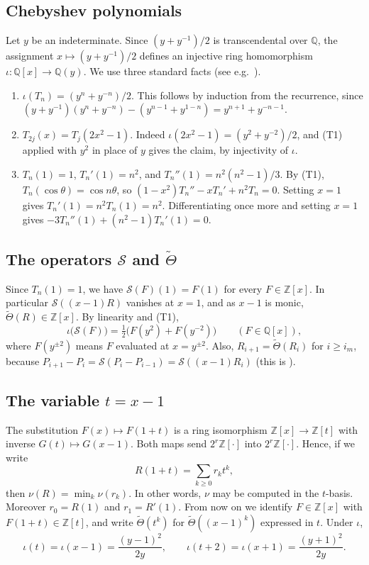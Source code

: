 \documentclass[11pt]{amsart}
\theoremstyle{definition}
\theoremstyle{remark}
\newcommand{\Z}{\mathbb{Z}}
\newcommand{\Q}{\mathbb{Q}}
\newcommand{\Sop}{\mathcal{S}}
\newcommand{\Th}{\widetilde{\Theta}}
\begin{document}
\subsection{Chebyshev polynomials}
Let $y$ be an indeterminate. Since $(y+y^{-1})/2$ is transcendental over $\Q$, the assignment $x\mapsto (y+y^{-1})/2$ defines an injective ring homomorphism $\iota\colon\Q[x]\to\Q(y)$. We use three standard facts (see e.g.\ \cite{MH}).
\begin{enumerate}[(T1)]
\item $\iota(T_n)=(y^n+y^{-n})/2$. This follows by induction from the recurrence, since $(y+y^{-1})(y^n+y^{-n})-(y^{n-1}+y^{1-n})=y^{n+1}+y^{-n-1}$.
\item $T_{2j}(x)=T_j(2x^2-1)$. Indeed $\iota(2x^2-1)=(y^2+y^{-2})/2$, and (T1) applied with $y^2$ in place of $y$ gives the claim, by injectivity of $\iota$.
\item $T_n(1)=1$, $T_n'(1)=n^2$, and $T_n''(1)=n^2(n^2-1)/3$. By (T1), $T_n(\cos\theta)=\cos n\theta$, so $(1-x^2)T_n''-xT_n'+n^2T_n=0$. Setting $x=1$ gives $T_n'(1)=n^2T_n(1)=n^2$. Differentiating once more and setting $x=1$ gives $-3T_n''(1)+(n^2-1)T_n'(1)=0$.
\end{enumerate}

\subsection{The operators \texorpdfstring{$\Sop$}{S} and \texorpdfstring{$\Th$}{Theta}}
Since $T_n(1)=1$, we have $\Sop(F)(1)=F(1)$ for every $F\in\Z[x]$. In particular $\Sop((x-1)R)$ vanishes at $x=1$, and as $x-1$ is monic, $\Th(R)\in\Z[x]$. By linearity and (T1),
\begin{equation}\label{eq:Siota}
  \iota\big(\Sop(F)\big)=\tfrac12\big(F(y^2)+F(y^{-2})\big)\qquad(F\in\Q[x]),
\end{equation}
where $F(y^{\pm2})$ means $F$ evaluated at $x=y^{\pm2}$. Also, $R_{i+1}=\Th(R_i)$ for $i\ge i_m$, because $P_{i+1}-P_i=\Sop(P_i-P_{i-1})=\Sop((x-1)R_i)$ (this is \cite[Lemma~6.1]{ST}).

\subsection{The variable \texorpdfstring{$t=x-1$}{t = x - 1}}
The substitution $F(x)\mapsto F(1+t)$ is a ring isomorphism $\Z[x]\to\Z[t]$ with inverse $G(t)\mapsto G(x-1)$. Both maps send $2^r\Z[\cdot]$ into $2^r\Z[\cdot]$. Hence, if we write
\[
  R(1+t)=\sum_{k\ge0}r_kt^k ,
\]
then $\nu(R)=\min_k\nu(r_k)$. In other words, $\nu$ may be computed in the $t$-basis. Moreover $r_0=R(1)$ and $r_1=R'(1)$. From now on we identify $F\in\Z[x]$ with $F(1+t)\in\Z[t]$, and write $\Th(t^k)$ for $\Th((x-1)^k)$ expressed in $t$. Under $\iota$,
\begin{equation}\label{eq:tiota}
  \iota(t)=\iota(x-1)=\frac{(y-1)^2}{2y},\qquad \iota(t+2)=\iota(x+1)=\frac{(y+1)^2}{2y}.
\end{equation}
\end{document}
